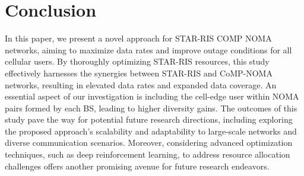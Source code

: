 \documentclass[conference]{IEEEtran}
\begin{document}
\section{Conclusion}
In this paper, we present a novel approach for STAR-RIS COMP NOMA networks, aiming to maximize data rates and improve outage conditions for all cellular users. By thoroughly optimizing STAR-RIS resources, this study effectively harnesses the synergies between STAR-RIS and CoMP-NOMA networks, resulting in elevated data rates and expanded data coverage. An essential aspect of our investigation is including the cell-edge user within NOMA pairs formed by each BS, leading to higher diversity gains. The outcomes of this study pave the way for potential future research directions, including exploring the proposed approach's scalability and adaptability to large-scale networks and diverse communication scenarios. Moreover, considering advanced optimization techniques, such as deep reinforcement learning, to address resource allocation challenges offers another promising avenue for future research endeavors.



\end{document}
